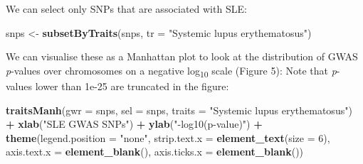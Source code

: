 \documentclass[9pt,a4paper,]{extarticle}
\newenvironment{Shaded}{\begin{snugshade}}{\end{snugshade}}
\newcommand{\KeywordTok}[1]{\textcolor[rgb]{0.13,0.29,0.53}{\textbf{#1}}}
\newcommand{\DataTypeTok}[1]{\textcolor[rgb]{0.13,0.29,0.53}{#1}}
\newcommand{\DecValTok}[1]{\textcolor[rgb]{0.00,0.00,0.81}{#1}}
\newcommand{\StringTok}[1]{\textcolor[rgb]{0.31,0.60,0.02}{#1}}
\newcommand{\OperatorTok}[1]{\textcolor[rgb]{0.81,0.36,0.00}{\textbf{#1}}}
\newcommand{\NormalTok}[1]{#1}
\theoremstyle{definition}
\theoremstyle{definition}
\theoremstyle{definition}
\theoremstyle{remark}
\begin{document}
We can select only SNPs that are associated with SLE:

\begin{Shaded}
\begin{Highlighting}[]
\NormalTok{snps <-}\StringTok{ }\KeywordTok{subsetByTraits}\NormalTok{(snps, }\DataTypeTok{tr =} \StringTok{"Systemic lupus erythematosus"}\NormalTok{)}
\end{Highlighting}
\end{Shaded}

We can visualise these as a Manhattan plot to look at the distribution of GWAS \emph{p}-values over chromosomes on a negative log\textsubscript{10} scale (Figure 5):
Note that \emph{p}-values lower than 1e-25 are truncated in the figure:

\begin{Shaded}
\begin{Highlighting}[]
\KeywordTok{traitsManh}\NormalTok{(}\DataTypeTok{gwr =}\NormalTok{ snps, }\DataTypeTok{sel =}\NormalTok{ snps, }\DataTypeTok{traits =} \StringTok{"Systemic lupus erythematosus"}\NormalTok{) }\OperatorTok{+}
\StringTok{  }\KeywordTok{xlab}\NormalTok{(}\StringTok{"SLE GWAS SNPs"}\NormalTok{) }\OperatorTok{+}
\StringTok{  }\KeywordTok{ylab}\NormalTok{(}\StringTok{"-log10(p-value)"}\NormalTok{) }\OperatorTok{+}
\StringTok{  }\KeywordTok{theme}\NormalTok{(}\DataTypeTok{legend.position =} \StringTok{"none"}\NormalTok{,}
        \DataTypeTok{strip.text.x =} \KeywordTok{element_text}\NormalTok{(}\DataTypeTok{size =} \DecValTok{6}\NormalTok{),}
        \DataTypeTok{axis.text.x =} \KeywordTok{element_blank}\NormalTok{(),}
        \DataTypeTok{axis.ticks.x =} \KeywordTok{element_blank}\NormalTok{())}
\end{Highlighting}
\end{Shaded}
\end{document}
